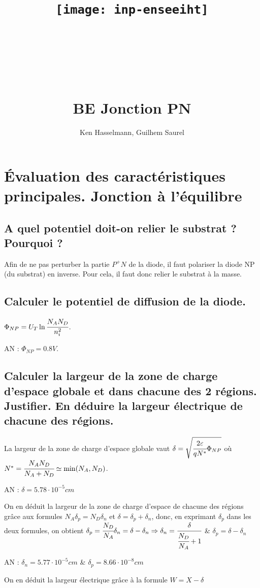\documentclass[10pt]{article}
\title{\texttt{[image: inp-enseeiht]} \\ ~ \\ ~ \\ ~ \\ ~ \\ BE Jonction PN}
\author{Ken Hasselmann, Guilhem Saurel}
\date{\oldstylenums{\today}}
\begin{document}
 \begin{titlepage}
  \maketitle
  \tableofcontents
 \end{titlepage}

 \section{Évaluation des caractéristiques principales. Jonction à l'équilibre}
  \subsection{A quel potentiel doit-on relier le substrat ? Pourquoi ?}
   Afin de ne pas perturber la partie $P^+N$ de la diode, il faut polariser la diode NP (du substrat) en inverse. Pour cela, il faut donc relier le substrat à la masse.

  \subsection{Calculer le potentiel de diffusion de la diode.}
   $\Phi_{NP} = U_T \ln\cfrac{N_A N_D}{n_i^2}$.
   
   AN : $\Phi_{NP} = 0.8V$.

  \subsection{Calculer la largeur de la zone de charge d’espace globale et dans chacune des 2 régions. Justifier. En déduire la largeur électrique de chacune des régions.} 
   La largeur de la zone de charge d'espace globale vaut $\delta = \sqrt{\cfrac{2\varepsilon}{qN^\ast}\Phi_{NP}}$ où $N^\ast = \cfrac{N_A N_D}{N_A + N_D} \simeq \min(N_A,N_D)$. 
   
   AN : $\delta = 5.78\cdot 10^{-5}cm$

   On en déduit la largeur de la zone de charge d'espace de chacune des régions grâce aux formules $N_A \delta_p = N_D \delta_n$ et $\delta = \delta_p + \delta_n$, donc, en exprimant $\delta_p$ dans les deux formules, on obtient $\delta_p = \cfrac{N_D}{N_A}\delta_n = \delta - \delta_n \Rightarrow \delta_n =\cfrac{\delta}{\cfrac{N_D}{N_A} +1}$ \& $\delta_p = \delta - \delta_n$

   AN : $\delta_n = 5.77\cdot 10^{-5} cm$ \& $\delta_p = 8.66\cdot 10^{-8}cm$

   On en déduit la largeur électrique grâce à la formule $W = X - \delta$
\end{document}
